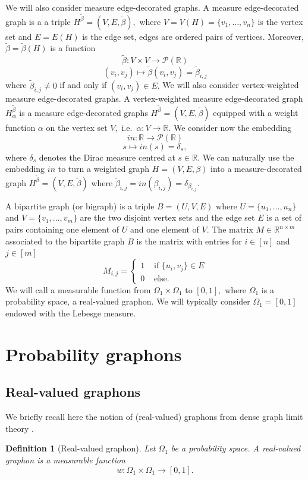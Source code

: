 \documentclass[11pt]{article}
\newtheorem{definition}[theorem]{Definition}
\def\R{\mathbb{R}}
\newcommand{\cP}{{\mathcal P}}  %
\begin{document}
We will also consider measure edge-decorated graphs. A measure edge-decorated graph is a a triple $H^{\tilde \beta}=(V,E,\tilde \beta),$ where $V=V(H)=\{v_1,\ldots,v_n\}$ is the vertex set and $E=E(H)$ is the edge set, edges are ordered pairs of vertices. Moreover, $\tilde \beta=\tilde \beta(H)$ is a function
$$
\tilde\beta:V\times V\rightarrow \cP(\R)
$$
$$
(v_i,v_j)\mapsto \tilde\beta(v_i,v_j)=\tilde \beta_{i,j}$$
where $\tilde \beta_{i,j}\neq 0$ if and only if $(v_i,v_j)\in E.$ We will also consider vertex-weighted measure edge-decorated graphs. A vertex-weighted measure edge-decorated graph $H_{\alpha}^{\tilde{\beta}}$ is a measure edge-decorated graphs $H^{\tilde \beta}=(V,E,\tilde \beta)$ equipped with a weight function $\alpha$ on the vertex set $V,$ i.e.\ $\alpha:V\rightarrow \R.$ We consider now the embedding $$
in:\R \rightarrow \cP(\R)
$$
$$s \mapsto in(s)=\delta_s,$$
where $\delta_s$ denotes the Dirac measure centred at $s\in \R.$ We can naturally use the embedding $in$ to turn a weighted graph $H=(V,E,\beta)$  into a measure-decorated graph $H^{\widetilde \beta}=(V,E,\widetilde\beta)$ where $\widetilde \beta_{i,j}=in(\beta_{i,j})=\delta_{\beta_{i,j}}.$

A bipartite graph (or bigraph) is a triple $B=(U,V,E)$ where $U=\{u_1,\ldots,u_n\}$ and $V=\{v_1,\ldots,v_m\}$ are the two disjoint vertex sets and the edge set $E$ is a set of pairs containing one element of $U$ and one element of $V.$ The matrix $M\in \R^{n\times m}$ associated to the bipartite graph $B$ is the matrix with entries for $i\in [n]$ and $j\in [m]$$$
M_{i,j}=\begin{cases}
    1 & \text{ if }\{u_i,v_j\}\in E\\
    0 & \text{ else.}
\end{cases}
$$
\newline
We will call a measurable function from $\Omega_1\times \Omega_1$ to $[0,1],$ where $\Omega_1$ is a probability space, a real-valued graphon. We will typically consider $\Omega_1=[0,1]$ endowed with the Lebesge measure.  


\section{Probability graphons}\label{Sec2ProbGraphons}

\subsection{Real-valued graphons}
We briefly recall here the notion of (real-valued) graphons from dense graph limit theory \cite{LovaszGraphLimits,LOVASZ2006933,BORGS20081801,borgs2011convergentAnnals}.
\begin{definition}[Real-valued graphon]
   Let $\Omega_1$ be a probability space. A \emph{real-valued graphon} is a measurable function
    $$w:\Omega_1\times \Omega_1\rightarrow [0,1].$$
\end{definition}
\end{document}
